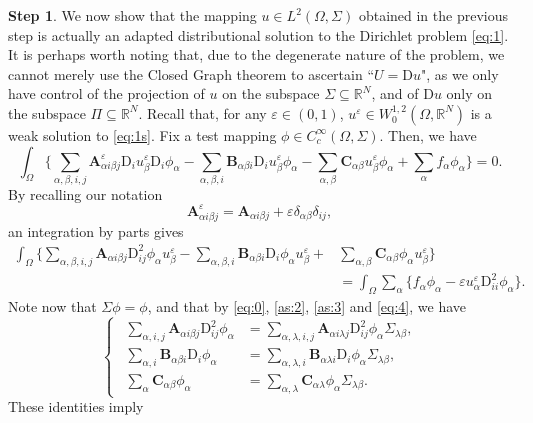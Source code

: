 \documentclass{amsart}
\numberwithin{equation}{section}
\numberwithin{thm}{section}
\theoremstyle{definition}
\newtheorem{proofpart}{Step}
\def\R{\mathbb{R}}
\def\D{\mathrm{D}}
\def\Om{\Omega}
\renewcommand{\:}{\!:\!} %
\newcommand{\al}{\alpha}
\newcommand{\be}{\beta}
\newcommand{\de}{\delta}
\newcommand{\e}{\varepsilon}
\newcommand{\Si}{\Sigma}
\newcommand{\la}{\lambda}
\newcommand{\sub}{\subseteq}
\renewcommand{\^}[1]{^{#1}_{\phantom{l}}}
\begin{document}
\begin{proofpart}
We now show that the mapping $u \in L^2(\Omega, \Sigma)$ obtained in the previous step is actually an adapted distributional solution to the Dirichlet problem \eqref{eq:1}. It is perhaps worth noting that, due to the degenerate nature of the problem, we cannot merely use the Closed Graph theorem to ascertain ``$U=\D u$", as we only have control of the projection of $u$ on the subspace  $\Si \sub \R^N$, and of $\D u$ only on the subspace $\Pi \sub \R^N$. Recall that, for any $\varepsilon \in (0,1)$, $u^{\varepsilon} \in W^{1,2}_0(\Om,\R^N)$ is a weak solution to \eqref{eq:1s}. Fix a test mapping $\phi \in C^\infty_c(\Om,\Si)$. Then, we have
\[
\int_\Om \bigg\{\sum_{\al, \beta, i, j} \mathbf{A}^\e_{\alpha i \beta j} \mathrm{D}_{i}u^{\varepsilon}_{\beta}\D_i \phi_\al - \sum_{\al,\beta, i} \mathbf{B}_{\alpha \beta i}\mathrm{D}_{i}u^{\varepsilon}_{\beta} \phi_\al - \sum_{\al, \beta} \mathbf{C}_{\alpha \beta}u^{\varepsilon}_{\beta}\phi_\al +\sum_{\al}f_{\alpha}\phi_\al \bigg\}=0.
\]
By recalling our notation
\[
\mathbf{A}^\e_{\alpha i \beta j} =\mathbf{A}_{\alpha i \beta j} +\e \de_{\al\be}\de_{ij},
\]
an integration by parts gives
\[
\begin{split}
\int_\Om \bigg\{\sum_{\al, \beta, i, j} \mathbf{A}_{\alpha i \beta j} \D^2_{ij} \phi_\al u^{\varepsilon}_{\beta} -  \sum_{\al,\beta, i} \mathbf{B}_{\alpha \beta i} \D_i \phi_\al u^{\varepsilon}_{\beta}  + & \sum_{\al, \beta} \mathbf{C}_{\alpha \beta} \phi_\al  u^{\varepsilon}_{\beta} \bigg\}
\\
&= \int_\Om \sum_{\al} \Big\{ f_{\alpha}\phi_\al -\e  u^{\varepsilon}_{\al}\D^2_{ii} \phi_\al \Big\}.
\end{split}
\]
Note now that $\Sigma \phi = \phi$, and that by  \eqref{eq:0}, \eqref{as:2}, \eqref{as:3} and \eqref{eq:4}, we have 
\[
\left\{ 
 \ \ 
 \begin{split}
\sum_{\al, i, j}  \mathbf{A}_{\alpha i \beta j} \mathrm{D}^2_{ij} \phi_{\al} &= \sum_{\al, \la, i, j} \mathbf{A}_{\al i \la j} \mathrm{D}^2_{ij} \phi_{\al} \Sigma_{\lambda \be},
\\
\sum_{\al, i}  \mathbf{B}_{\alpha \beta i}\mathrm{D}_i \phi_{\al}& = \sum_{\al, \lambda, i}  \mathbf{B}_{\al \la i}\mathrm{D}_i \phi_{\al} \Sigma_{\lambda \be},
\\
\sum_{\al}  \mathbf{C}_{\alpha \beta}\phi_\al &= \sum_{\al, \lambda}  \mathbf{C}_{\al \lambda}\phi_\al \Sigma_{\lambda \be}.
\end{split}
\right.
\]
These identities imply
\[
\begin{split}

\end{split}\]
\end{proofpart}
\end{document}

